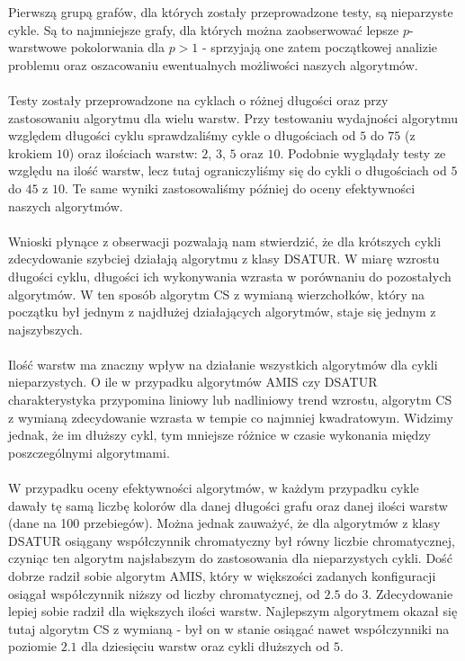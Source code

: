 \documentclass[10pt,a4paper]{article}
\begin{document}
	Pierwszą grupą grafów, dla których zostały przeprowadzone testy, są nieparzyste cykle. Są to najmniejsze grafy, dla których można zaobserwować lepsze $p$-warstwowe pokolorwania dla $p > 1$ - sprzyjają one zatem początkowej analizie problemu oraz oszacowaniu ewentualnych możliwości naszych algorytmów.
	\\~\\
	Testy zostały przeprowadzone na cyklach o różnej długości oraz przy zastosowaniu algorytmu dla wielu warstw. Przy testowaniu wydajności algorytmu względem długości cyklu sprawdzaliśmy cykle o długościach od $5$ do $75$ (z krokiem $10$) oraz ilościach warstw: $2$, $3$, $5$ oraz $10$. Podobnie wyglądały testy ze względu na ilość warstw, lecz tutaj ograniczyliśmy się do cykli o długościach od $5$ do $45$ z $10$. Te same wyniki zastosowaliśmy później do oceny efektywności naszych algorytmów.
	\\~\\
	Wnioski płynące z obserwacji pozwalają nam stwierdzić, że dla krótszych cykli zdecydowanie szybciej działają algorytmu z klasy DSATUR. W miarę wzrostu długości cyklu, długości ich wykonywania wzrasta w porównaniu do pozostałych algorytmów. W ten sposób algorytm CS z wymianą wierzchołków, który na początku był jednym z najdłużej działających algorytmów, staje się jednym z najszybszych. 
	\\~\\
	Ilość warstw ma znaczny wpływ na działanie wszystkich algorytmów dla cykli nieparzystych. O ile w przypadku algorytmów AMIS czy DSATUR charakterystyka przypomina liniowy lub nadliniowy trend wzrostu, algorytm CS z wymianą zdecydowanie wzrasta w tempie co najmniej kwadratowym. Widzimy jednak, że im dłuższy cykl, tym mniejsze różnice w czasie wykonania między poszczególnymi algorytmami.
	\\~\\
	W przypadku oceny efektywności algorytmów, w każdym przypadku cykle dawały tę samą liczbę kolorów dla danej długości grafu oraz danej ilości warstw (dane na 100 przebiegów). Można jednak zauważyć, że dla algorytmów z klasy DSATUR osiągany współczynnik chromatyczny był równy liczbie chromatycznej, czyniąc ten algorytm najsłabszym do zastosowania dla nieparzystych cykli. Dość dobrze radził sobie algorytm AMIS, który w większości zadanych konfiguracji osiągał współczynnik niższy od liczby chromatycznej, od $2.5$ do $3$. Zdecydowanie lepiej sobie radził dla większych ilości warstw. Najlepszym algorytmem okazał się tutaj algorytm CS z wymianą - był on w stanie osiągać nawet współczynniki na poziomie $2.1$ dla dziesięciu warstw oraz cykli dłuższych od $5$. 
	
\end{document}
